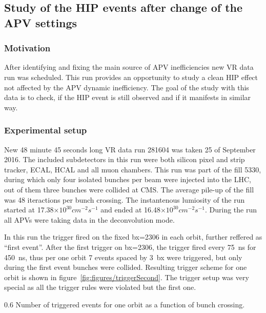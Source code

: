 \subsection{Study of the HIP events after change of the APV settings}

\subsubsection{Motivation}

After identifying and fixing the main source of APV inefficiencies new VR data run was scheduled. This run provides an opportunity to study a clean HIP effect not affected by the APV dynamic inefficiency. The goal of the study with this data is to check, if the HIP event is still observed and if it manifests in similar way.


\subsubsection{Experimental setup}

New 48 minute 45 seconds long VR data run 281604 was taken 25 of September 2016. The included subdetectors in this run were both silicon pixel and strip tracker, ECAL, HCAL and all muon chambers. This run was part of the fill 5330, during which only four isolated bunches per beam were injected into the LHC, out of them three bunches were collided at CMS. The average pile-up of the fill was 48 iteractions per bunch crossing. The instantenous lumiosity of the run started at 17.38$\times 10^{30} cm^{-2} s^{-1}$ and ended at 16.48$\times 10^{30} cm^{-2} s^{-1}$. During the run all APVs were taking data in the deconvolution mode. 

In this run the trigger fired on the fixed bx=2306 in each orbit, further reffered as ``first event''. After the first trigger on bx=2306, the trigger fired every 75~ns for 450~ns, thus per one orbit 7 events spaced by 3~bx were triggered, but only during the first event bunches were collided. Resulting trigger scheme for one orbit is shown in figure~\ref{fig:figures/triggerSecond}. The trigger setup was very special as all the trigger rules were violated but the first one.

                 {0.6}       %
                 {Number of triggered events for one orbit as a function of bunch crossing.} %

